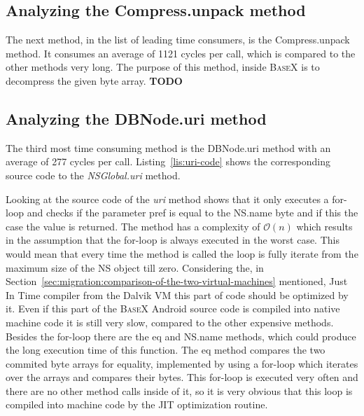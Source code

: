 \subsection*{Analyzing the \textsf{Compress.unpack} method}
\label{sec:analyzing-the-compress.unpack-method}
The next method, in the list of leading time consumers, is the \textsf{Compress.unpack} method.
It consumes an average of 1121 cycles per call, which is compared to the other methods very long.
The purpose of this method, inside \textsc{BaseX} is to decompress the given byte array.
\textbf{TODO}

\subsection*{Analyzing the \textsf{DBNode.uri} method}
\label{sec:analyzing-the-dbnode.uri-method}
The third most time consuming method is the \textsf{DBNode.uri} method with an average of 277 cycles per call.
Listing~\ref{lis:uri-code} shows the corresponding source code to the \textit{NSGlobal.uri} method.
		
Looking at the source code of the \textit{uri} method shows that it only executes a for-loop and checks if the parameter \textsf{pref} is equal to the \textsf{NS.name} byte and if this the case the value is returned.
The method has a complexity of $\mathcal O(n)$ which results in the assumption that the for-loop is always executed in the worst case.
This would mean that every time the method is called the loop is fully iterate from the maximum size of the \textsf{NS} object till zero.
Considering the, in Section~\ref{sec:migration:comparison-of-the-two-virtual-machines} mentioned, Just In Time compiler from the Dalvik VM this part of code should be optimized by it.
Even if this part of the \textsc{BaseX} Android source code is compiled into native machine code it is still very slow, compared to the other expensive methods.
Besides the for-loop there are the \textsf{eq} and \textsf{NS.name} methods, which could produce the long execution time of this function.
The \textsf{eq} method compares the two commited byte arrays for equality, implemented by using a for-loop which iterates over the arrays and compares their bytes.
This for-loop is executed very often and there are no other method calls inside of it, so it is very obvious that this loop is compiled into machine code by the JIT optimization routine.\\
